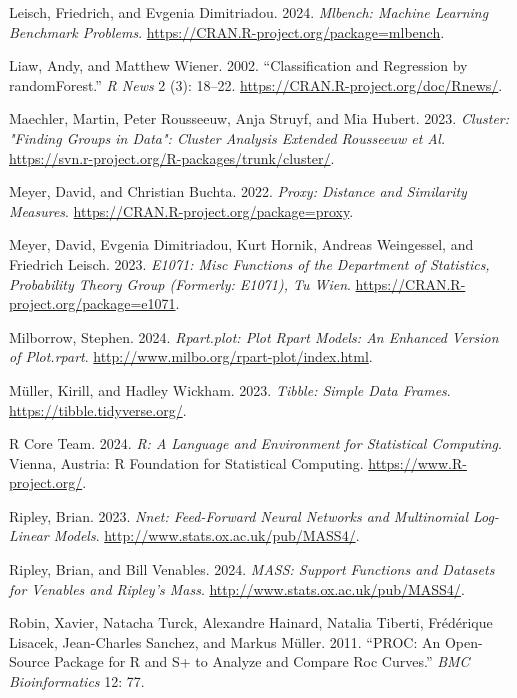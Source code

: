 \documentclass[
  notitlepage]{book}
\newlength{\cslhangindent}
\newenvironment{cslreferences}%
  {\setlength{\parindent}{0pt}%
  \everypar{\setlength{\hangindent}{\cslhangindent}}\ignorespaces}%
  {\par}
\begin{document}
\begin{cslreferences}
\leavevmode\hypertarget{ref-R-mlbench}{}%
Leisch, Friedrich, and Evgenia Dimitriadou. 2024. \emph{Mlbench: Machine Learning Benchmark Problems}. \url{https://CRAN.R-project.org/package=mlbench}.

\leavevmode\hypertarget{ref-randomForest2002}{}%
Liaw, Andy, and Matthew Wiener. 2002. ``Classification and Regression by randomForest.'' \emph{R News} 2 (3): 18--22. \url{https://CRAN.R-project.org/doc/Rnews/}.

\leavevmode\hypertarget{ref-R-cluster}{}%
Maechler, Martin, Peter Rousseeuw, Anja Struyf, and Mia Hubert. 2023. \emph{Cluster: "Finding Groups in Data": Cluster Analysis Extended Rousseeuw et Al.} \url{https://svn.r-project.org/R-packages/trunk/cluster/}.

\leavevmode\hypertarget{ref-R-proxy}{}%
Meyer, David, and Christian Buchta. 2022. \emph{Proxy: Distance and Similarity Measures}. \url{https://CRAN.R-project.org/package=proxy}.

\leavevmode\hypertarget{ref-R-e1071}{}%
Meyer, David, Evgenia Dimitriadou, Kurt Hornik, Andreas Weingessel, and Friedrich Leisch. 2023. \emph{E1071: Misc Functions of the Department of Statistics, Probability Theory Group (Formerly: E1071), Tu Wien}. \url{https://CRAN.R-project.org/package=e1071}.

\leavevmode\hypertarget{ref-R-rpart.plot}{}%
Milborrow, Stephen. 2024. \emph{Rpart.plot: Plot Rpart Models: An Enhanced Version of Plot.rpart}. \url{http://www.milbo.org/rpart-plot/index.html}.

\leavevmode\hypertarget{ref-R-tibble}{}%
Müller, Kirill, and Hadley Wickham. 2023. \emph{Tibble: Simple Data Frames}. \url{https://tibble.tidyverse.org/}.

\leavevmode\hypertarget{ref-R-base}{}%
R Core Team. 2024. \emph{R: A Language and Environment for Statistical Computing}. Vienna, Austria: R Foundation for Statistical Computing. \url{https://www.R-project.org/}.

\leavevmode\hypertarget{ref-R-nnet}{}%
Ripley, Brian. 2023. \emph{Nnet: Feed-Forward Neural Networks and Multinomial Log-Linear Models}. \url{http://www.stats.ox.ac.uk/pub/MASS4/}.

\leavevmode\hypertarget{ref-R-MASS}{}%
Ripley, Brian, and Bill Venables. 2024. \emph{MASS: Support Functions and Datasets for Venables and Ripley's Mass}. \url{http://www.stats.ox.ac.uk/pub/MASS4/}.

\leavevmode\hypertarget{ref-pROC2011}{}%
Robin, Xavier, Natacha Turck, Alexandre Hainard, Natalia Tiberti, Frédérique Lisacek, Jean-Charles Sanchez, and Markus Müller. 2011. ``PROC: An Open-Source Package for R and S+ to Analyze and Compare Roc Curves.'' \emph{BMC Bioinformatics} 12: 77.


\end{cslreferences}
\end{document}
